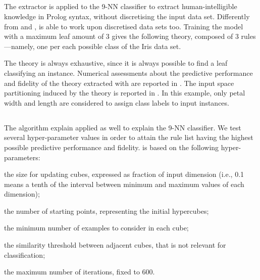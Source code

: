 \documentclass[
]{ceurart}
\begin{document}
\subsection{\cart{}}



The \cart{} extractor is applied to the 9-NN classifier to extract human-intelligible knowledge in Prolog syntax, without discretising the input data set.
%
Differently from \iter{} and \gridex{}, \cart{} is able to work upon discretised data sets too.
%
Training the model with a maximum leaf amount of 3 gives the following theory, composed of 3 rules---namely, one per each possible class of the Iris data set.


The theory is always exhaustive, since it is always possible to find a leaf classifying an instance.
%
Numerical assessments about the predictive performance and fidelity of the theory extracted with \cart{} are reported in .
%
The input space partitioning induced by the theory is reported in .
%
In this example, only petal width and length are considered to assign class labels to input instances.

\subsection{\iter{}}



The \iter{} algorithm explain applied as well to explain the 9-NN classifier.
%
We test several hyper-parameter values in order to attain the rule list having the highest possible predictive performance and fidelity.
%
\iter{} is based on the following hyper-parameters:
%
\begin{inlinelist}
	\item the size for updating cubes, expressed as fraction of input dimension (i.e., 0.1 means a tenth of the interval between minimum and maximum values of each dimension);
	\item the number of starting points, representing the initial hypercubes;
	\item the minimum number of examples to consider in each cube;
	\item the similarity threshold between adjacent cubes, that is not relevant for classification;
	\item the maximum number of iterations, fixed to 600.
\end{inlinelist}
\end{document}
